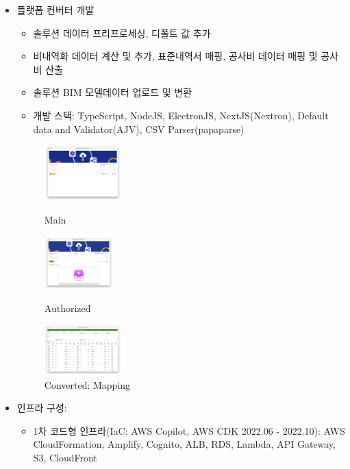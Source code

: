 \begin{itemize}
\begin{itemize}[label=$\star$]
\begin{figure}[!ht]
	      \end{figure}
	\item 플랫폼 컨버터 개발
	      \begin{itemize}
		      \item 솔루션 데이터 프리프로세싱, 디폴트 값 추가
		      \item 비내역화 데이터 계산 및 추가, 표준내역서 매핑, 공사비 데이터 매핑 및 공사비 산출
		      \item 솔루션 BIM 모델데이터 업로드 및 변환
		      \item 개발 스택: TypeScript, NodeJS, ElectronJS, NextJS(Nextron), Default data and Validator(AJV), CSV Parser(papaparse)
	      \end{itemize}
	      \begin{figure}[!ht]
		      \begin{fullwidth}
			      \parbox{0.45\textwidth}{
				      \centering
				      \includegraphics[width=0.28\textwidth]{images/builderhub-converter-main.png}
				      \caption*{Main}
			      }\qquad
			      \parbox{0.45\textwidth}{
				      \centering
				      \includegraphics[width=0.25\textwidth]{images/builderhub-converter-auth.png}
				      \caption*{Authorized}
			      }\qquad
			      \parbox{0.45\textwidth}{
				      \centering
				      \includegraphics[width=0.28\textwidth]{images/builderhub-converter-converted.png}
				      \caption*{Converted: Mapping}
			      }
		      \end{fullwidth}
	      \end{figure}
	\item 인프라 구성:
	      \begin{itemize}
		      \item 1차 코드형 인프라(IaC: AWS Copilot, AWS CDK 2022.06 - 2022.10): AWS CloudFormation, Amplify, Cognito, ALB, RDS, Lambda, API Gateway, S3, CloudFront

\end{itemize}
\end{itemize}
\end{itemize}
